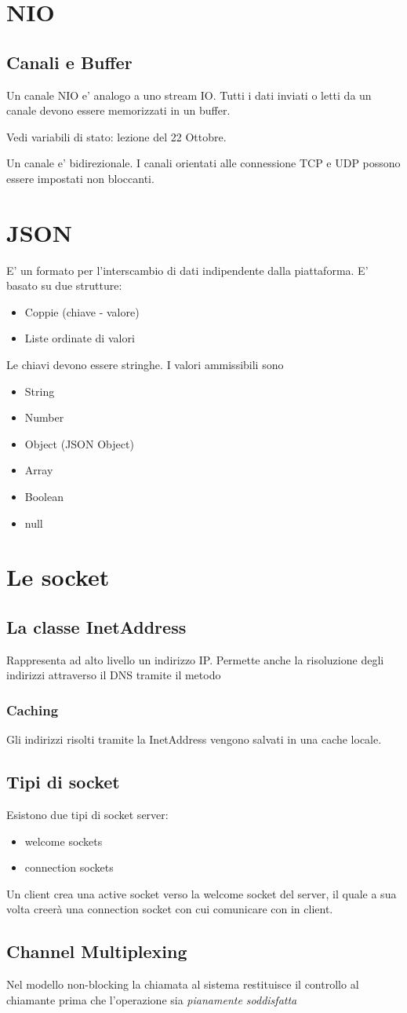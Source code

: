 \chapter{NIO}
\section{Canali e Buffer}
Un canale NIO e' analogo a uno stream IO.
Tutti i dati inviati o letti da un canale devono essere memorizzati in un buffer.

Vedi variabili di stato: lezione del 22 Ottobre.

Un canale e' bidirezionale. I canali orientati alle connessione TCP e UDP possono essere impostati non bloccanti.
\chapter{JSON}
E' un formato per l'interscambio di dati indipendente dalla piattaforma.
E' basato su due strutture: 
\begin{itemize}
    \item Coppie (chiave - valore)
    \item Liste ordinate di valori
\end{itemize}
Le chiavi devono essere stringhe.
I valori ammissibili sono
\begin{itemize}
    \item String
    \item Number
    \item Object (JSON Object)
    \item Array
    \item Boolean
    \item null
\end{itemize}
\chapter{Le socket}
\section{La classe InetAddress}
Rappresenta ad alto livello un indirizzo IP. Permette anche la risoluzione degli indirizzi attraverso il DNS tramite il metodo 
\subsection{Caching}
Gli indirizzi risolti tramite la InetAddress vengono salvati in una cache locale.
\section{Tipi di socket}
Esistono due tipi di socket server:
\begin{itemize}
    \item welcome sockets
    \item connection sockets
\end{itemize}
Un client crea una active socket verso la welcome socket del server, il quale a sua volta creerà una connection socket con cui comunicare con in client.

\section{Channel Multiplexing}
Nel modello non-blocking la chiamata al sistema restituisce il controllo al chiamante prima che l'operazione sia \textit{pianamente soddisfatta}
